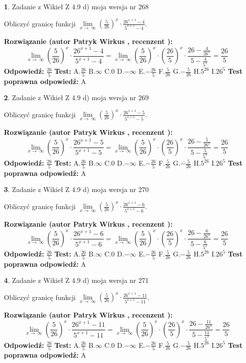 \documentclass[12pt, a4paper]{article}
\theoremstyle{definition} %
\newtheorem{zad}{}
\newcommand{\zadStart}[1]{\begin{zad}#1\newline}
\newcommand{\zadStop}{\end{zad}}
\newcommand{\rozwStart}[2]{\noindent \textbf{Rozwiązanie (autor #1 , recenzent #2): }\newline}
\newcommand{\rozwStop}{\newline}
\newcommand{\odpStart}{\noindent \textbf{Odpowiedź:}\newline}
\newcommand{\odpStop}{\newline}
\newcommand{\testStart}{\noindent \textbf{Test:}\newline}
\newcommand{\testStop}{\newline}
\newcommand{\kluczStart}{\noindent \textbf{Test poprawna odpowiedź:}\newline}
\newcommand{\kluczStop}{\newline}
\begin{document}
\zadStart{Zadanie z Wikieł Z 4.9 d) moja wersja nr 268}


Obliczyć granicę funkcji  $\lim\limits_{x\to\ \infty}(\frac{5}{26})^{x}\cdot\frac{26^{x+1}-4}{5^{x+1}-4}$.
\zadStop
\rozwStart{Patryk Wirkus}{}
$$\lim\limits_{x\to\ \infty}(\frac{5}{26})^{x}\cdot\frac{26^{x+1}-4}{5^{x+1}-4}=\lim\limits_{x\to\ \infty}(\frac{5}{26})^{x}\cdot(\frac{26}{5})^{x} \cdot \frac{26-\frac{4}{26^{x}}}{5-\frac{4}{5^{x}}} = \frac{26}{5}$$
\rozwStop
\odpStart
$\frac{26}{5}$
\odpStop
\testStart
A.$\frac{26}{5}$ B.$\infty$ C.$0$ D.$-\infty$ E.$-\frac{26}{5}$
F.$\frac{5}{26}$ G.$-\frac{5}{26}$
H.$5^{26}$
I.$26^{5}$
\testStop
\kluczStart
A
\kluczStop



\zadStart{Zadanie z Wikieł Z 4.9 d) moja wersja nr 269}


Obliczyć granicę funkcji  $\lim\limits_{x\to\ \infty}(\frac{5}{26})^{x}\cdot\frac{26^{x+1}-5}{5^{x+1}-5}$.
\zadStop
\rozwStart{Patryk Wirkus}{}
$$\lim\limits_{x\to\ \infty}(\frac{5}{26})^{x}\cdot\frac{26^{x+1}-5}{5^{x+1}-5}=\lim\limits_{x\to\ \infty}(\frac{5}{26})^{x}\cdot(\frac{26}{5})^{x} \cdot \frac{26-\frac{5}{26^{x}}}{5-\frac{5}{5^{x}}} = \frac{26}{5}$$
\rozwStop
\odpStart
$\frac{26}{5}$
\odpStop
\testStart
A.$\frac{26}{5}$ B.$\infty$ C.$0$ D.$-\infty$ E.$-\frac{26}{5}$
F.$\frac{5}{26}$ G.$-\frac{5}{26}$
H.$5^{26}$
I.$26^{5}$
\testStop
\kluczStart
A
\kluczStop



\zadStart{Zadanie z Wikieł Z 4.9 d) moja wersja nr 270}


Obliczyć granicę funkcji  $\lim\limits_{x\to\ \infty}(\frac{5}{26})^{x}\cdot\frac{26^{x+1}-6}{5^{x+1}-6}$.
\zadStop
\rozwStart{Patryk Wirkus}{}
$$\lim\limits_{x\to\ \infty}(\frac{5}{26})^{x}\cdot\frac{26^{x+1}-6}{5^{x+1}-6}=\lim\limits_{x\to\ \infty}(\frac{5}{26})^{x}\cdot(\frac{26}{5})^{x} \cdot \frac{26-\frac{6}{26^{x}}}{5-\frac{6}{5^{x}}} = \frac{26}{5}$$
\rozwStop
\odpStart
$\frac{26}{5}$
\odpStop
\testStart
A.$\frac{26}{5}$ B.$\infty$ C.$0$ D.$-\infty$ E.$-\frac{26}{5}$
F.$\frac{5}{26}$ G.$-\frac{5}{26}$
H.$5^{26}$
I.$26^{5}$
\testStop
\kluczStart
A
\kluczStop



\zadStart{Zadanie z Wikieł Z 4.9 d) moja wersja nr 271}


Obliczyć granicę funkcji  $\lim\limits_{x\to\ \infty}(\frac{5}{26})^{x}\cdot\frac{26^{x+1}-11}{5^{x+1}-11}$.
\zadStop
\rozwStart{Patryk Wirkus}{}
$$\lim\limits_{x\to\ \infty}(\frac{5}{26})^{x}\cdot\frac{26^{x+1}-11}{5^{x+1}-11}=\lim\limits_{x\to\ \infty}(\frac{5}{26})^{x}\cdot(\frac{26}{5})^{x} \cdot \frac{26-\frac{11}{26^{x}}}{5-\frac{11}{5^{x}}} = \frac{26}{5}$$
\rozwStop
\odpStart
$\frac{26}{5}$
\odpStop
\testStart
A.$\frac{26}{5}$ B.$\infty$ C.$0$ D.$-\infty$ E.$-\frac{26}{5}$
F.$\frac{5}{26}$ G.$-\frac{5}{26}$
H.$5^{26}$
I.$26^{5}$
\testStop
\kluczStart
A
\kluczStop
\end{document}
